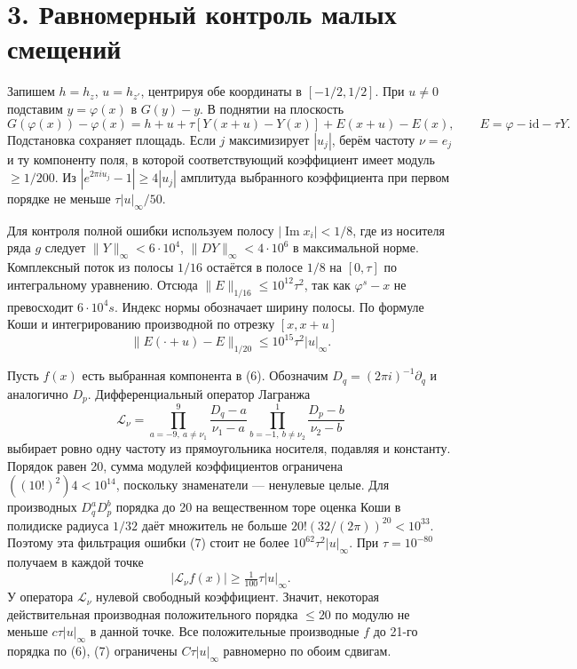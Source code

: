 \documentclass[11pt,a4paper]{article}
\newcommand{\sect}[1]{\section*{\sffamily\color{ink}#1}}
\begin{document}
\newpage
\sect{3. Равномерный контроль малых смещений}
Запишем \(h=h_z\), \(u=h_{z'}\), центрируя обе координаты в \([-1/2,1/2]\). При \(u\ne0\) подставим \(y=\varphi(x)\) в \(G(y)-y\). В поднятии на плоскость
\begin{equation}
    G(\varphi(x))-\varphi(x)=
   h+u+\tau[Y(x+u)-Y(x)]+E(x+u)-E(x),\qquad
   E=\varphi-\mathrm{id}-\tau Y.                                  \tag{6}
\end{equation}
Подстановка сохраняет площадь. Если \(j\) максимизирует \(|u_j|\), берём частоту \(\nu=e_j\) и ту компоненту поля, в которой соответствующий коэффициент имеет модуль \(\ge1/200\). Из \(|e^{2\pi i u_j}-1|\ge4|u_j|\) амплитуда выбранного коэффициента при первом порядке не меньше \(\tau |u|_\infty/50\).

Для контроля полной ошибки используем полосу \(|\operatorname{Im}x_i|<1/8\), где из носителя ряда \(g\) следует \(\|Y\|_\infty<6\cdot10^4\), \(\|DY\|_\infty<4\cdot10^6\) в максимальной норме. Комплексный поток из полосы \(1/16\) остаётся в полосе \(1/8\) на \([0,\tau]\) по интегральному уравнению. Отсюда \(\|E\|_{1/16}\le10^{12}\tau^2\), так как \(\varphi^s-x\) не превосходит \(6\cdot10^4 s\). Индекс нормы обозначает ширину полосы. По формуле Коши и интегрированию производной по отрезку \([x,x+u]\)
\[
                   \|E(\cdot+u)-E\|_{1/20}
                          \le10^{15}\tau^2 |u|_\infty .          \tag{7}
\]

Пусть \(f(x)\) есть выбранная компонента в (6). Обозначим \(D_q=(2\pi i)^{-1}\partial_q\) и аналогично \(D_p\). Дифференциальный оператор Лагранжа
\[
  \mathcal L_\nu=
  \prod_{a=-9,\ a\ne\nu_1}^9\frac{D_q-a}{\nu_1-a}
  \prod_{b=-1,\ b\ne\nu_2}^1\frac{D_p-b}{\nu_2-b}
\]
выбирает ровно одну частоту из прямоугольника носителя, подавляя и константу. Порядок равен 20, сумма модулей коэффициентов ограничена \(((10!)^2)4<10^{14}\), поскольку знаменатели — ненулевые целые. Для производных \(D_q^aD_p^b\) порядка до 20 на вещественном торе оценка Коши в полидиске радиуса \(1/32\) даёт множитель не больше \(20!(32/(2\pi))^{20}<10^{33}\). Поэтому эта фильтрация ошибки (7) стоит не более \(10^{62}\tau^2|u|_\infty\). При \(\tau=10^{-80}\) получаем в каждой точке
\[
          |\mathcal L_\nu f(x)|\ge\tfrac1{100}\tau|u|_\infty .
\]
У оператора \(\mathcal L_\nu\) нулевой свободный коэффициент. Значит, некоторая действительная производная положительного порядка \(\le20\) по модулю не меньше \(c\tau|u|_\infty\) в данной точке. Все положительные производные \(f\) до 21-го порядка по (6), (7) ограничены \(C\tau|u|_\infty\) равномерно по обоим сдвигам.
\end{document}
